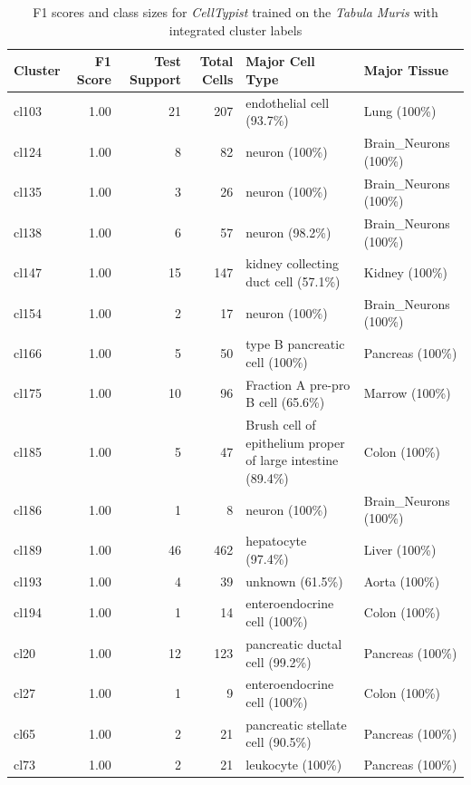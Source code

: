 \begin{table}[ht!]
\scriptsize
\caption[F1 scores and class sizes for \textit{CellTypist} trained on the \textit{Tabula Muris} with integrated cluster labels]{F1 scores and class sizes for \textit{CellTypist} trained on the \textit{Tabula Muris} with integrated cluster labels}
\centering
\label{table:tab_tmmodelclust}
\begin{tabular}{lrrrll}
  \toprule
Cluster & F1 Score & Test Support & Total Cells & Major Cell Type & Major Tissue \\
  \midrule
cl103 & 1.00 &  21 & 207 & endothelial cell (93.7\%) & Lung (100\%) \\ 
  cl124 & 1.00 &   8 &  82 & neuron (100\%) & Brain\_Neurons (100\%) \\ 
  cl135 & 1.00 &   3 &  26 & neuron (100\%) & Brain\_Neurons (100\%) \\ 
  cl138 & 1.00 &   6 &  57 & neuron (98.2\%) & Brain\_Neurons (100\%) \\ 
  cl147 & 1.00 &  15 & 147 & kidney collecting duct cell (57.1\%) & Kidney (100\%) \\ 
  cl154 & 1.00 &   2 &  17 & neuron (100\%) & Brain\_Neurons (100\%) \\ 
  cl166 & 1.00 &   5 &  50 & type B pancreatic cell (100\%) & Pancreas (100\%) \\ 
  cl175 & 1.00 &  10 &  96 & Fraction A pre-pro B cell (65.6\%) & Marrow (100\%) \\ 
  cl185 & 1.00 &   5 &  47 & \specialcell[t]{Brush cell of epithelium proper\\of large intestine (89.4\%) } & Colon (100\%) \\ 
  cl186 & 1.00 &   1 &   8 & neuron (100\%) & Brain\_Neurons (100\%) \\ 
  cl189 & 1.00 &  46 & 462 & hepatocyte (97.4\%) & Liver (100\%) \\ 
  cl193 & 1.00 &   4 &  39 & unknown (61.5\%) & Aorta (100\%) \\ 
  cl194 & 1.00 &   1 &  14 & enteroendocrine cell (100\%) & Colon (100\%) \\ 
  cl20 & 1.00 &  12 & 123 & pancreatic ductal cell (99.2\%) & Pancreas (100\%) \\ 
  cl27 & 1.00 &   1 &   9 & enteroendocrine cell (100\%) & Colon (100\%) \\ 
  cl65 & 1.00 &   2 &  21 & pancreatic stellate cell (90.5\%) & Pancreas (100\%) \\ 
  cl73 & 1.00 &   2 &  21 & leukocyte (100\%) & Pancreas (100\%) \\ 

\end{tabular}
\end{table}
